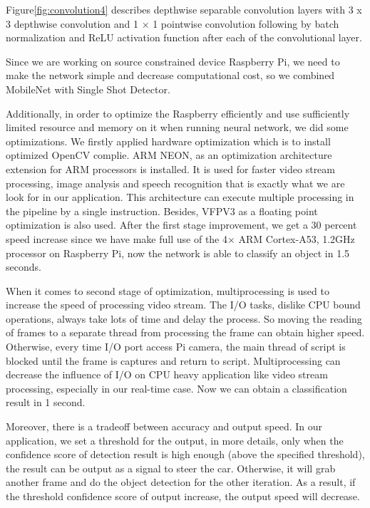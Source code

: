 \documentclass[11pt, titlepage]{article} %
\begin{document}
Figure\ref{fig:convolution4} describes depthwise separable convolution layers with 3 x 3 depthwise convolution and 1 × 1 pointwise convolution following by batch normalization and ReLU activation function after each of the convolutional layer.

Since we are working on source constrained device Raspberry Pi, we need to make the network simple and decrease computational cost, so we combined MobileNet with Single Shot Detector.

Additionally, in order to optimize the Raspberry efficiently and use sufficiently limited resource and memory on it when running neural network, we did some optimizations. We firstly applied hardware optimization which is to install optimized OpenCV complie. ARM NEON, as an optimization architecture extension for ARM processors is installed. It is used for faster video stream processing, image analysis and speech recognition that is exactly what we are look for in our application. This architecture can execute multiple processing in the pipeline by a single instruction. Besides, VFPV3 as a floating point optimization is also used. After the first stage improvement, we get a 30 percent speed increase since we have make full use of the 4× ARM Cortex-A53, 1.2GHz processor on Raspberry Pi, now the network is able to classify an object in 1.5 seconds. 

When it comes to second stage of optimization, multiprocessing is used to increase the speed of processing video stream. The I/O tasks, dislike CPU bound operations, always take lots of time and delay the process. So moving the reading of frames to a separate thread from processing the frame can obtain higher speed. Otherwise, every time I/O port access Pi camera, the main thread of script is blocked until the frame is captures and return to script. Multiprocessing can decrease the influence of I/O on CPU heavy application like video stream processing, especially in our real-time case. Now we can obtain a classification result in 1 second.

Moreover, there is a tradeoff between accuracy and output speed. In our application, we set a threshold for the output, in more details, only when the confidence score of detection result is high enough (above the specified threshold), the result can be output as a signal to steer the car. Otherwise, it will grab another frame and do the object detection for the other iteration. As a result, if the threshold confidence score of output increase, the output speed will decrease. 
\end{document}
